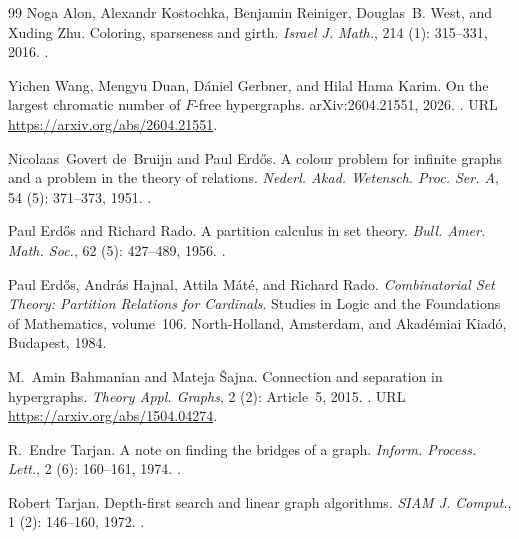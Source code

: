 \documentclass[a4paper,11pt,reqno]{amsart}
\theoremstyle{plain}
\theoremstyle{definition}
\theoremstyle{remark}
\begin{document}
\begin{thebibliography}{99}
Noga Alon, Alexandr Kostochka, Benjamin Reiniger, Douglas~B. West, and Xuding Zhu.
\newblock Coloring, sparseness and girth.
\newblock \emph{Israel J. Math.}, 214 (1): 315--331, 2016.
\newblock {}.

Yichen Wang, Mengyu Duan, D{\'a}niel Gerbner, and Hilal Hama Karim.
\newblock On the largest chromatic number of {$F$}-free hypergraphs.
\newblock arXiv:2604.21551, 2026.
\newblock {}.
\newblock URL \url{https://arxiv.org/abs/2604.21551}.

Nicolaas~Govert de~Bruijn and Paul Erd{\H{o}}s.
\newblock A colour problem for infinite graphs and a problem in the theory of
  relations.
\newblock \emph{Nederl. Akad. Wetensch. Proc. Ser. A}, 54
  (5): 371--373, 1951.
\newblock {}.

Paul Erd{\H{o}}s and Richard Rado.
\newblock A partition calculus in set theory.
\newblock \emph{Bull. Amer. Math. Soc.}, 62
  (5): 427--489, 1956.
\newblock {}.

Paul Erd{\H{o}}s, Andr{\'a}s Hajnal, Attila M{\'a}t{\'e}, and Richard Rado.
\newblock \emph{Combinatorial Set Theory: Partition Relations for Cardinals}.
\newblock Studies in Logic and the Foundations of Mathematics, volume~106.
  North-Holland, Amsterdam, and Akad{\'e}miai Kiad{\'o}, Budapest, 1984.

M.~Amin Bahmanian and Mateja \v{S}ajna.
\newblock Connection and separation in hypergraphs.
\newblock \emph{Theory Appl. Graphs}, 2 (2): Article~5, 2015.
\newblock {}.
\newblock URL \url{https://arxiv.org/abs/1504.04274}.

R.~Endre Tarjan.
\newblock A note on finding the bridges of a graph.
\newblock \emph{Inform. Process. Lett.}, 2 (6): 160--161, 1974.
\newblock {}.

Robert Tarjan.
\newblock Depth-first search and linear graph algorithms.
\newblock \emph{SIAM J. Comput.}, 1 (2): 146--160, 1972.
\newblock {}.


\end{thebibliography}
\end{document}
